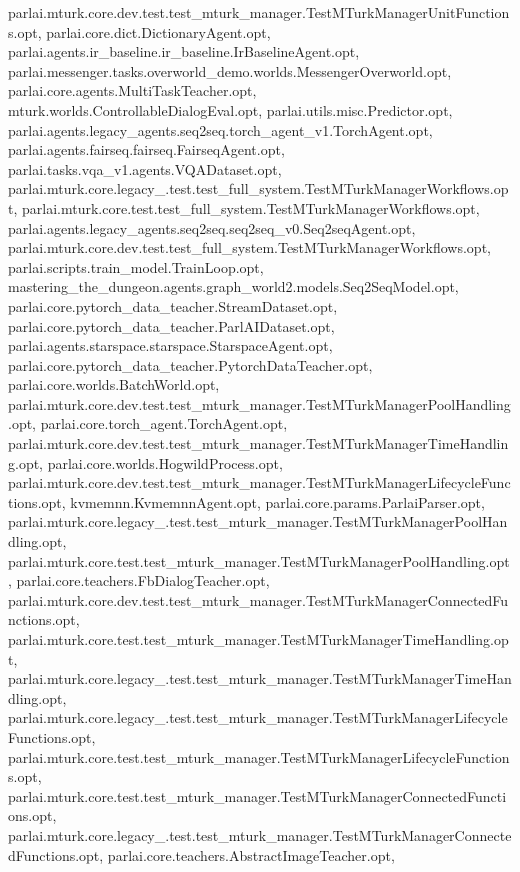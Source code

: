 parlai.\+mturk.\+core.\+dev.\+test.\+test\+\_\+mturk\+\_\+manager.\+Test\+M\+Turk\+Manager\+Unit\+Functions.\+opt, parlai.\+core.\+dict.\+Dictionary\+Agent.\+opt, parlai.\+agents.\+ir\+\_\+baseline.\+ir\+\_\+baseline.\+Ir\+Baseline\+Agent.\+opt, parlai.\+messenger.\+tasks.\+overworld\+\_\+demo.\+worlds.\+Messenger\+Overworld.\+opt, parlai.\+core.\+agents.\+Multi\+Task\+Teacher.\+opt, mturk.\+worlds.\+Controllable\+Dialog\+Eval.\+opt, parlai.\+utils.\+misc.\+Predictor.\+opt, parlai.\+agents.\+legacy\+\_\+agents.\+seq2seq.\+torch\+\_\+agent\+\_\+v1.\+Torch\+Agent.\+opt, parlai.\+agents.\+fairseq.\+fairseq.\+Fairseq\+Agent.\+opt, parlai.\+tasks.\+vqa\+\_\+v1.\+agents.\+V\+Q\+A\+Dataset.\+opt, parlai.\+mturk.\+core.\+legacy\+\_.\+test.\+test\+\_\+full\+\_\+system.\+Test\+M\+Turk\+Manager\+Workflows.\+opt, parlai.\+mturk.\+core.\+test.\+test\+\_\+full\+\_\+system.\+Test\+M\+Turk\+Manager\+Workflows.\+opt, parlai.\+agents.\+legacy\+\_\+agents.\+seq2seq.\+seq2seq\+\_\+v0.\+Seq2seq\+Agent.\+opt, parlai.\+mturk.\+core.\+dev.\+test.\+test\+\_\+full\+\_\+system.\+Test\+M\+Turk\+Manager\+Workflows.\+opt, parlai.\+scripts.\+train\+\_\+model.\+Train\+Loop.\+opt, mastering\+\_\+the\+\_\+dungeon.\+agents.\+graph\+\_\+world2.\+models.\+Seq2\+Seq\+Model.\+opt, parlai.\+core.\+pytorch\+\_\+data\+\_\+teacher.\+Stream\+Dataset.\+opt, parlai.\+core.\+pytorch\+\_\+data\+\_\+teacher.\+Parl\+A\+I\+Dataset.\+opt, parlai.\+agents.\+starspace.\+starspace.\+Starspace\+Agent.\+opt, parlai.\+core.\+pytorch\+\_\+data\+\_\+teacher.\+Pytorch\+Data\+Teacher.\+opt, parlai.\+core.\+worlds.\+Batch\+World.\+opt, parlai.\+mturk.\+core.\+dev.\+test.\+test\+\_\+mturk\+\_\+manager.\+Test\+M\+Turk\+Manager\+Pool\+Handling.\+opt, parlai.\+core.\+torch\+\_\+agent.\+Torch\+Agent.\+opt, parlai.\+mturk.\+core.\+dev.\+test.\+test\+\_\+mturk\+\_\+manager.\+Test\+M\+Turk\+Manager\+Time\+Handling.\+opt, parlai.\+core.\+worlds.\+Hogwild\+Process.\+opt, parlai.\+mturk.\+core.\+dev.\+test.\+test\+\_\+mturk\+\_\+manager.\+Test\+M\+Turk\+Manager\+Lifecycle\+Functions.\+opt, kvmemnn.\+Kvmemnn\+Agent.\+opt, parlai.\+core.\+params.\+Parlai\+Parser.\+opt, parlai.\+mturk.\+core.\+legacy\+\_.\+test.\+test\+\_\+mturk\+\_\+manager.\+Test\+M\+Turk\+Manager\+Pool\+Handling.\+opt, parlai.\+mturk.\+core.\+test.\+test\+\_\+mturk\+\_\+manager.\+Test\+M\+Turk\+Manager\+Pool\+Handling.\+opt, parlai.\+core.\+teachers.\+Fb\+Dialog\+Teacher.\+opt, parlai.\+mturk.\+core.\+dev.\+test.\+test\+\_\+mturk\+\_\+manager.\+Test\+M\+Turk\+Manager\+Connected\+Functions.\+opt, parlai.\+mturk.\+core.\+test.\+test\+\_\+mturk\+\_\+manager.\+Test\+M\+Turk\+Manager\+Time\+Handling.\+opt, parlai.\+mturk.\+core.\+legacy\+\_.\+test.\+test\+\_\+mturk\+\_\+manager.\+Test\+M\+Turk\+Manager\+Time\+Handling.\+opt, parlai.\+mturk.\+core.\+legacy\+\_.\+test.\+test\+\_\+mturk\+\_\+manager.\+Test\+M\+Turk\+Manager\+Lifecycle\+Functions.\+opt, parlai.\+mturk.\+core.\+test.\+test\+\_\+mturk\+\_\+manager.\+Test\+M\+Turk\+Manager\+Lifecycle\+Functions.\+opt, parlai.\+mturk.\+core.\+test.\+test\+\_\+mturk\+\_\+manager.\+Test\+M\+Turk\+Manager\+Connected\+Functions.\+opt, parlai.\+mturk.\+core.\+legacy\+\_.\+test.\+test\+\_\+mturk\+\_\+manager.\+Test\+M\+Turk\+Manager\+Connected\+Functions.\+opt, parlai.\+core.\+teachers.\+Abstract\+Image\+Teacher.\+opt, 